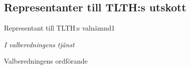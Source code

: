 \documentclass[10pt]{article}
\begin{document}
    \subsection{Representanter till TLTH:s utskott}
    \begin{vallista}
        \begin{post}{Representant till TLTH:s valnämnd}{1}
            \vakant
        \end{post}
    \end{vallista}
    \begin{signatures}{1}
        \emph{I valberedningens tjänst}
        \signature{Axel Voss}{Valberedningens ordförande}
    \end{signatures}
    
    
\end{document}
